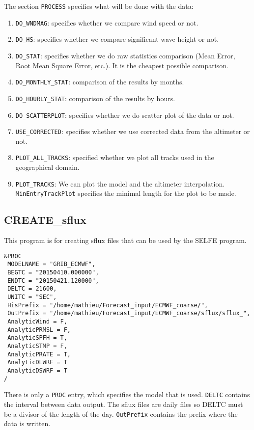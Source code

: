 \documentclass[12pt]{amsart}
\begin{document}
The section {\tt PROCESS} specifies what will be done with the data:
\begin{enumerate}
\item {\tt DO\_WNDMAG}: specifies whether we compare wind speed or not.
\item {\tt DO\_HS}: specifies whether we compare significant wave height or not.
\item {\tt DO\_STAT}: specifies whether we do raw statistics comparison (Mean Error, Root Mean Square Error, etc.). It is the cheapest possible comparison.
\item {\tt DO\_MONTHLY\_STAT}: comparison of the results by months.
\item {\tt DO\_HOURLY\_STAT}: comparison of the results by hours.
\item {\tt DO\_SCATTERPLOT}: specifies whether we do scatter plot of the data or not.
\item {\tt USE\_CORRECTED}: specifies whether we use corrected data from the altimeter or not.
\item {\tt PLOT\_ALL\_TRACKS}: specified whether we plot all tracks used in the geographical domain.
\item {\tt PLOT\_TRACKS}: We can plot the model and the altimeter interpolation. {\tt MinEntryTrackPlot} specifies the minimal length for the plot to be made.
\end{enumerate}


\subsection{CREATE\_sflux}

This program is for creating sflux files that can be used by the SELFE program.
\begin{verbatim}
&PROC
 MODELNAME = "GRIB_ECMWF", 
 BEGTC = "20150410.000000",
 ENDTC = "20150421.120000",
 DELTC = 21600, 
 UNITC = "SEC", 
 HisPrefix = "/home/mathieu/Forecast_input/ECMWF_coarse/", 
 OutPrefix = "/home/mathieu/Forecast_input/ECMWF_coarse/sflux/sflux_", 
 AnalyticWind = F,
 AnalyticPRMSL = F,
 AnalyticSPFH = T,
 AnalyticSTMP = F,
 AnalyticPRATE = T,
 AnalyticDLWRF = T
 AnalyticDSWRF = T
/
\end{verbatim}
There is only a {\tt PROC} entry, which specifies the model that is used. {\tt DELTC} contains the interval between data output. The sflux files are daily files so DELTC must be a divisor of the length of the day.
{\tt OutPrefix} contains the prefix where the data is written.
\end{document}
